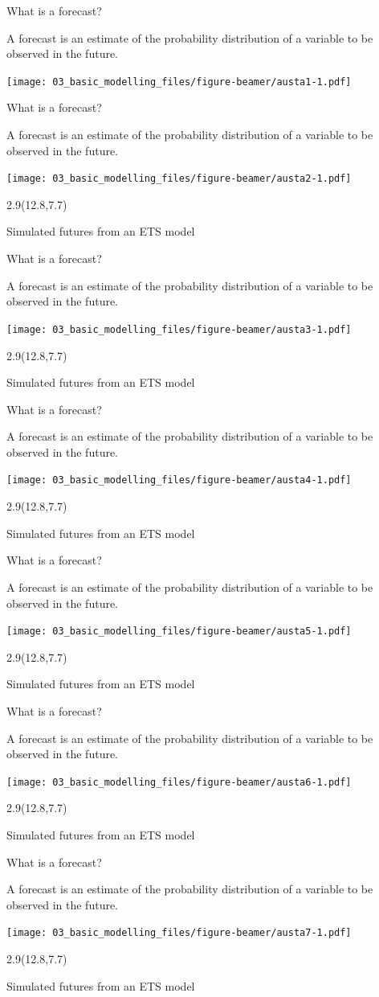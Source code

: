\documentclass[
  14pt,
  ignorenonframetext,
  aspectratio=169,
]{beamer}
\def\forecast{\begin{alertblock}{}\fontsize{10}{11}\sf
 A forecast is an estimate of the probability distribution of a variable to be observed in the future.
\end{alertblock}}
\def\simfutures{\begin{textblock}{2.9}(12.8,7.7)
\begin{block}{}\fontsize{10}{11}\sf
Simulated futures from an ETS model
\end{block}\end{textblock}}
\begin{document}
\begin{frame}{What is a forecast?}
\protect\hypertarget{what-is-a-forecast}{}
\forecast\pause

\texttt{[image: 03\_basic\_modelling\_files/figure-beamer/austa1-1.pdf]}
\end{frame}

\begin{frame}{What is a forecast?}
\protect\hypertarget{what-is-a-forecast-1}{}
\forecast

\texttt{[image: 03\_basic\_modelling\_files/figure-beamer/austa2-1.pdf]}

\simfutures
\end{frame}

\begin{frame}{What is a forecast?}
\protect\hypertarget{what-is-a-forecast-2}{}
\forecast

\texttt{[image: 03\_basic\_modelling\_files/figure-beamer/austa3-1.pdf]}

\simfutures
\end{frame}

\begin{frame}{What is a forecast?}
\protect\hypertarget{what-is-a-forecast-3}{}
\forecast

\texttt{[image: 03\_basic\_modelling\_files/figure-beamer/austa4-1.pdf]}

\simfutures
\end{frame}

\begin{frame}{What is a forecast?}
\protect\hypertarget{what-is-a-forecast-4}{}
\forecast

\texttt{[image: 03\_basic\_modelling\_files/figure-beamer/austa5-1.pdf]}

\simfutures
\end{frame}

\begin{frame}{What is a forecast?}
\protect\hypertarget{what-is-a-forecast-5}{}
\forecast

\texttt{[image: 03\_basic\_modelling\_files/figure-beamer/austa6-1.pdf]}

\simfutures
\end{frame}

\begin{frame}{What is a forecast?}
\protect\hypertarget{what-is-a-forecast-6}{}
\forecast

\texttt{[image: 03\_basic\_modelling\_files/figure-beamer/austa7-1.pdf]}

\simfutures
\end{frame}
\end{document}
